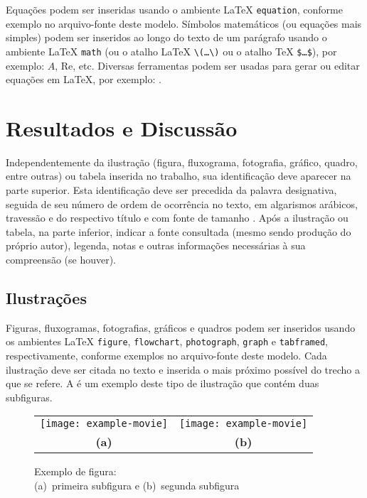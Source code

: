 \documentclass[%
  a4paper,%
  12pt,%
  fleqn,%
  english,%
  brazilian,%
]{article}
\begin{document}
Equações podem ser inseridas usando o ambiente \LaTeX{} \texttt{equation}, conforme exemplo no arquivo-fonte deste modelo.
Símbolos matemáticos (ou equações mais simples) podem ser inseridos ao longo do texto de um parágrafo usando o ambiente \LaTeX{} \texttt{math} (ou o atalho \LaTeX{} \texttt{\textbackslash(\ldots\textbackslash)} ou o atalho \TeX{} \texttt{\$\ldots\$}), por exemplo: $A$, $\mathrm{Re}$, etc.
Diversas ferramentas podem ser usadas para gerar ou editar equações em \LaTeX{}, por exemplo: .

\section{Resultados e Discussão}%
\label{sect:res-disc}

Independentemente da ilustração (figura, fluxograma, fotografia, gráfico, quadro, entre outras) ou tabela inserida no trabalho, sua identificação deve aparecer na parte superior.
Esta identificação deve ser precedida da palavra designativa, seguida de seu número de ordem de ocorrência no texto, em algarismos arábicos, travessão e do respectivo título e com fonte de tamanho .
Após a ilustração ou tabela, na parte inferior, indicar a fonte consultada (mesmo sendo produção do próprio autor), legenda, notas e outras informações necessárias à sua compreensão (se houver).

\subsection{Ilustrações}%
\label{ssect:ill}

Figuras, fluxogramas, fotografias, gráficos e quadros podem ser inseridos usando os ambientes \LaTeX{} \texttt{figure}, \texttt{flowchart}, \texttt{photograph}, \texttt{graph} e \texttt{tabframed}, respectivamente, conforme exemplos no arquivo-fonte deste modelo.
Cada ilustração deve ser citada no texto e inserida o mais próximo possível do trecho a que se refere.
A  é um exemplo deste tipo de ilustração que contém duas subfiguras.

\begin{figure}[!htbp]
\caption{Exemplo de figura:\\ (a)~primeira subfigura e (b)~segunda subfigura}%
\label{fig:example-movie}
\begin{tabular}{@{}cc@{}}
\texttt{[image: example-movie]}  &
\texttt{[image: example-movie]} \\
\textbf{(a)} & \textbf{(b)}
\end{tabular}
\end{figure}
\end{document}
